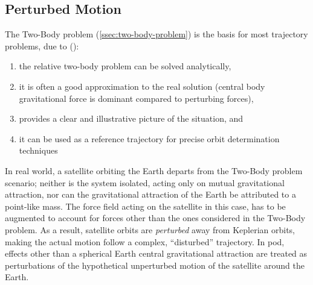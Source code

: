 \subsection{Perturbed Motion}
\label{ssec:perturbed-motion}

The Two-Body problem (\autoref{ssec:two-body-problem}) is the basis for most 
trajectory problems, due to (\cite{hintz}):
\begin{enumerate}
  \item the relative two-body problem can be solved analytically,
  \item it is often a good approximation to the real solution (central body 
    gravitational force is dominant compared to perturbing forces),
  \item provides a clear and illustrative picture of the situation, and
  \item it can be used as a reference trajectory for precise orbit 
    determination techniques
\end{enumerate}

In real world, a satellite orbiting the Earth departs from the Two-Body problem 
scenario; neither is the system isolated, acting only on mutual gravitational attraction, 
nor can the gravitational attraction of the Earth be attributed to a point-like mass. 
The force field acting on the satellite in this case, has to be augmented to account for 
forces other than the ones considered in the Two-Body problem. As a result, satellite 
orbits are \emph{perturbed} away from Keplerian orbits, making the actual motion 
follow a complex, ``disturbed'' trajectory. In \gls{pod}, effects other than a
spherical Earth central gravitational attraction are treated as perturbations of 
the hypothetical unperturbed motion of the satellite around the Earth. 


